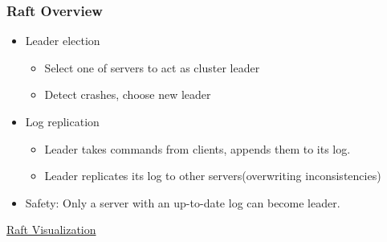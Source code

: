 
\begin{frame}
    \frametitle{Raft Overview}
    \begin{itemize}
        \item Leader election
            \begin{itemize}
                \item Select one of servers to act as cluster leader
                \item Detect crashes, choose new leader
            \end{itemize}
        \item Log replication
            \begin{itemize}
                \item Leader takes commands from clients, appends them to its log.
                \item Leader replicates its log to other servers(overwriting inconsistencies)
            \end{itemize}
        \item Safety: Only a server with an up-to-date log can become leader.
    \end{itemize}
\end{frame}

\begin{frame}
    \centering
    \href{http://thesecretlivesofdata.com/raft/}{Raft Visualization}
\end{frame}

